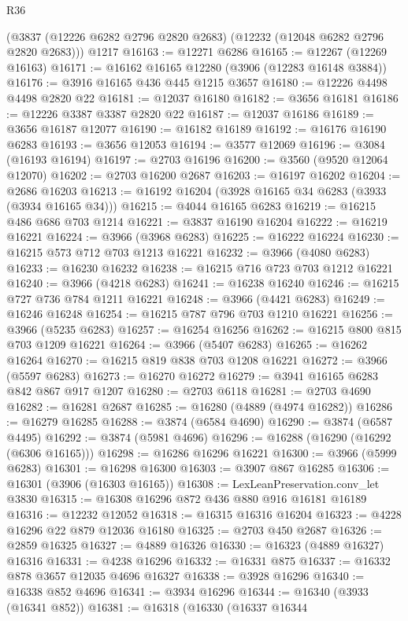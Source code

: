 \begin{lexlean}{R36}
\begin{coremodule}
    (@3837 (@12226 @6282 @2796 @2820 @2683) (@12232 (@12048 @6282 @2796 @2820 @2683)))
    @1217
@16163 := @12271 @6286
@16165 := @12267 (@12269 @16163)
@16171 := @16162 @16165 @12280 (@3906 (@12283 @16148 @3884))
@16176 := @3916 @16165 @436 @445 @1215 @3657
@16180 := @12226 @4498 @4498 @2820 @22
@16181 := @12037 @16180
@16182 := @3656 @16181
@16186 := @12226 @3387 @3387 @2820 @22
@16187 := @12037 @16186
@16189 := @3656 @16187 @12077
@16190 := @16182 @16189
@16192 := @16176 @16190 @6283
@16193 := @3656 @12053
@16194 := @3577 @12069
@16196 := @3084 (@16193 @16194)
@16197 := @2703 @16196
@16200 := @3560 (@9520 @12064 @12070)
@16202 := @2703 @16200 @2687
@16203 := @16197 @16202
@16204 := @2686 @16203
@16213 := @16192 @16204 (@3928 @16165 @34 @6283 (@3933 (@3934 @16165 @34)))
@16215 := @4044 @16165 @6283
@16219 := @16215 @486 @686 @703 @1214
@16221 := @3837 @16190 @16204
@16222 := @16219 @16221
@16224 := @3966 (@3968 @6283)
@16225 := @16222 @16224
@16230 := @16215 @573 @712 @703 @1213 @16221
@16232 := @3966 (@4080 @6283)
@16233 := @16230 @16232
@16238 := @16215 @716 @723 @703 @1212 @16221
@16240 := @3966 (@4218 @6283)
@16241 := @16238 @16240
@16246 := @16215 @727 @736 @784 @1211 @16221
@16248 := @3966 (@4421 @6283)
@16249 := @16246 @16248
@16254 := @16215 @787 @796 @703 @1210 @16221
@16256 := @3966 (@5235 @6283)
@16257 := @16254 @16256
@16262 := @16215 @800 @815 @703 @1209 @16221
@16264 := @3966 (@5407 @6283)
@16265 := @16262 @16264
@16270 := @16215 @819 @838 @703 @1208 @16221
@16272 := @3966 (@5597 @6283)
@16273 := @16270 @16272
@16279 := @3941 @16165 @6283 @842 @867 @917 @1207
@16280 := @2703 @6118
@16281 := @2703 @4690
@16282 := @16281 @2687
@16285 := @16280 (@4889 (@4974 @16282))
@16286 := @16279 @16285
@16288 := @3874 (@6584 @4690)
@16290 := @3874 (@6587 @4495)
@16292 := @3874 (@5981 @4696)
@16296 := @16288 (@16290 (@16292 (@6306 @16165)))
@16298 := @16286 @16296 @16221
@16300 := @3966 (@5999 @6283)
@16301 := @16298 @16300
@16303 := @3907 @867 @16285
@16306 := @16301 (@3906 (@16303 @16165))
@16308 := LexLeanPreservation.conv_let @3830
@16315 := @16308 @16296 @872 @436 @880 @916 @16181 @16189
@16316 := @12232 @12052
@16318 := @16315 @16316 @16204
@16323 := @4228 @16296 @22 @879 @12036 @16180
@16325 := @2703 @450 @2687
@16326 := @2859 @16325
@16327 := @4889 @16326
@16330 := @16323 (@4889 @16327) @16316
@16331 := @4238 @16296
@16332 := @16331 @875
@16337 := @16332 @878 @3657 @12035 @4696 @16327
@16338 := @3928 @16296
@16340 := @16338 @852 @4696
@16341 := @3934 @16296
@16344 := @16340 (@3933 (@16341 @852))
@16381 := @16318
    (@16330
      (@16337
        @16344

\end{coremodule}
\end{lexlean}
